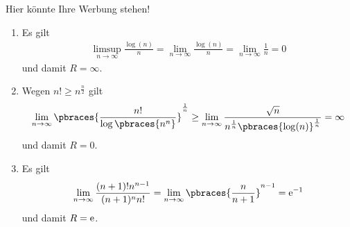 \begin{solution}
    Hier könnte Ihre Werbung stehen!
    \begin{enumerate}[label = \alph*)]
        \item Es gilt 
            \begin{align*}
                \limsup_{n \to \infty} \frac{\log(n)}{n} = \lim_{n \to \infty} \frac{\log(n)}{n} = \lim_{n \to \infty} \frac{1}{n} = 0
            \end{align*}
            und damit $R = \infty$.
        \item Wegen $n! \geq n^{\frac{n}{2}}$ gilt
        \begin{align*}
            \lim_{n \to \infty} \pbraces{\frac{n!}{\log\pbraces{n^n}}}^{\frac{1}{n}} \geq \lim_{n \to \infty} \frac{\sqrt{n}}{n^{\frac{1}{n}} \pbraces{\log(n)}^{\frac{1}{n}}} = \infty
        \end{align*}
        und damit $R = 0$.
        \item Es gilt
            \begin{align*}
                \lim_{n \to \infty} \frac{(n + 1)! n^{n - 1}}{(n + 1)^n n!} = \lim_{n \to \infty} \pbraces{\frac{n}{n + 1}}^{n - 1} = \rm{e}^{-1}
            \end{align*}
            und damit $R = \rm{e}$.
    \end{enumerate}
\end{solution}